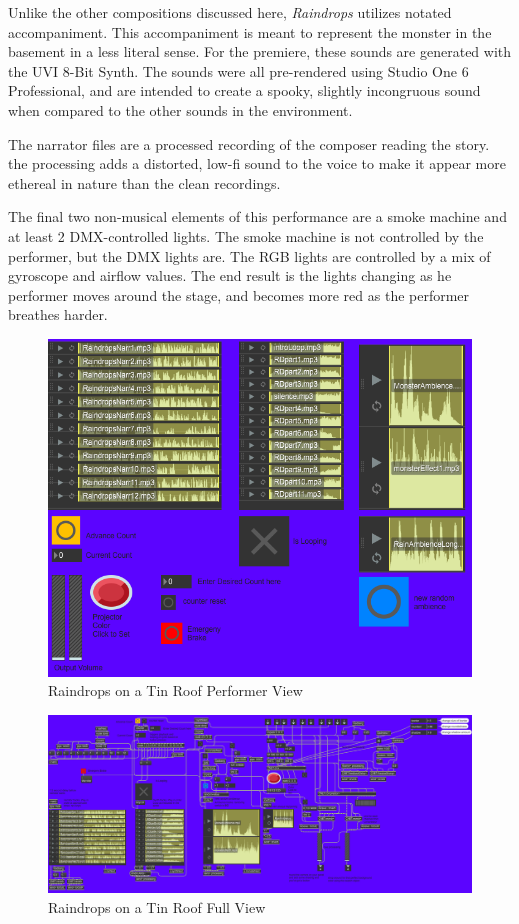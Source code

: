 Unlike the other compositions discussed here, \textit{Raindrops} utilizes notated accompaniment. This accompaniment is meant to represent the monster in the basement in a less literal sense. For the premiere, these sounds are generated with the UVI 8-Bit Synth. The sounds were all pre-rendered using Studio One 6 Professional, and are intended to create a spooky, slightly incongruous sound when compared to the other sounds in the environment. 

The narrator files are a processed recording of the composer reading the story. the processing adds a distorted, low-fi sound to the voice to make it appear more ethereal in nature than the clean recordings. 

The final two non-musical elements of this performance are a smoke machine and at least 2 DMX-controlled lights. The smoke machine is not controlled by the performer, but the DMX lights are. The RGB lights are controlled by a mix of gyroscope and airflow values. The end result is the lights changing as he performer moves around the stage, and becomes more red as the performer breathes harder.

\begin{figure}
    \centering
    \includegraphics{diagrams/maxPatches/raindropspres.png}
    \caption{Raindrops on a Tin Roof Performer View}
    \label{fig:raindropsPres}
\end{figure}

\begin{figure}
    \centering
    \includegraphics[scale=0.6]{diagrams/maxPatches/raindropsRaw.png}
    \caption{Raindrops on a Tin Roof Full View}
    \label{fig:raindropsRaw}
\end{figure}

